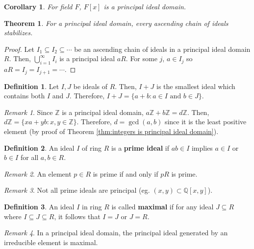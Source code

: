 \documentclass{article}
\newtheorem{theorem}{Theorem}[definition]
\newtheorem{corollary}{Corollary}[definition]
\theoremstyle{definition}
\newtheorem{definition}{Definition}[section]
\theoremstyle{remark}
\newtheorem{remark}{Remark}[definition]
\begin{document}
\begin{corollary}
    For field $F$, $F[x]$ is a principal ideal domain.
\end{corollary}

\begin{theorem}
    For a principal ideal domain, every ascending chain of ideals stabilizes.
\end{theorem}

\begin{proof}
    Let $I_1\subseteq I_2\subseteq\cdots$ be an ascending chain of ideals in a
    principal ideal domain $R$.
    Then, $\bigcup_{i=1}^\infty I_i$ is a principal ideal $aR$.
    For some $j$, $a\in I_j$ so $aR=I_j=I_{j+1}=\cdots$.
\end{proof}

\begin{definition}
    Let $I,J$ be ideals of $R$. Then, $I+J$ is the smallest ideal which contains
    both $I$ and $J$.
    Therefore, $I+J=\{a+b:a\in I\text{ and }b\in J\}$.
\end{definition}

\begin{remark}
    Since $\mathbb{Z}$ is a principal ideal domain, $a\mathbb{Z}+b\mathbb{Z}=d\mathbb{Z}$.
    Then, $d\mathbb{Z}=\{xa+yb:x,y\in\mathbb{Z}\}$.
    Therefore, $d=\gcd(a,b)$ since it is the least positive element (by proof
    of Theorem \ref{thm:integers is principal ideal domain}).
\end{remark}

\begin{definition}
    An ideal $I$ of ring $R$ is a \textbf{prime ideal} if $ab\in I$ implies
    $a\in I$ or $b\in I$ for all $a,b\in R$.
\end{definition}

\begin{remark}
    An element $p\in R$ is prime if and only if $pR$ is prime.
\end{remark}

\begin{remark}
    Not all prime ideals are principal (eg. $(x,y)\subset\mathbb{Q}[x,y]$).
\end{remark}

\begin{definition}
    An ideal $I$ in ring $R$ is called \textbf{maximal} if for any ideal
    $J\subseteq R$ where $I\subseteq J\subseteq R$, it follows that $I=J$ or
    $J=R$.
\end{definition}

\begin{remark}
    In a principal ideal domain, the principal ideal generated by an
    irreducible element is maximal.
\end{remark}
\end{document}
